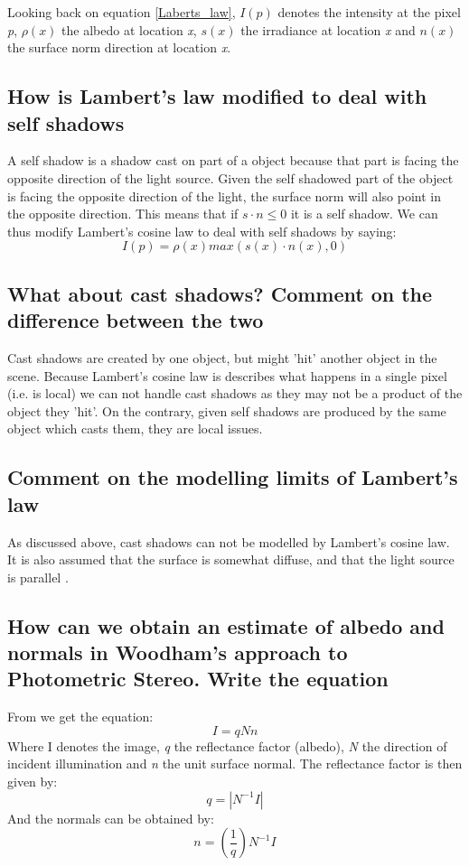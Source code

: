 Looking back on equation \ref{Laberts_law}, $I(p)$ denotes the intensity at the pixel \textit{p}, $\rho(x)$ the albedo at location \textit{x}, $s(x)$ the irradiance  at location \textit{x} and $n(x)$ the surface norm direction at location \textit{x}.

\subsection{How is Lambert’s law modified to deal with self shadows}
A self shadow is a shadow cast on part of a object because that part is facing the opposite direction of the light source. Given the self shadowed part of the object is facing the opposite direction of the light, the surface norm will also point in the opposite direction. This means that if $s \cdot n \leq 0$ it is a self shadow. We can thus modify Lambert's cosine law to deal with self shadows by saying:
\begin{equation*}
	I(p) = \rho(x)max(s(x) \cdot n(x), 0)
\end{equation*}

\subsection{What about cast shadows? Comment on the difference between the two}
Cast shadows are created by one object, but might 'hit' another object in the scene. Because Lambert's cosine law is describes what happens in a single pixel (i.e. is local) we can not handle cast shadows as they may not be a product of the object they 'hit'. On the contrary, given self shadows are produced by the same object which casts them, they are local issues.

\subsection{Comment on the modelling limits of Lambert’s law}
As discussed above, cast shadows can not be modelled by Lambert's cosine law. It is also assumed that the surface is somewhat diffuse, and that the light source is parallel .

\subsection{How can we obtain an estimate of albedo and normals in Woodham’s approach to Photometric Stereo. Write the equation}
From \cite{woodham} we get the equation:
\begin{equation*}
	I = qNn
\end{equation*}
Where I denotes the image, \textit{q} the reflectance factor (albedo), \textit{N} the direction of incident illumination and \textit{n} the unit surface normal. The reflectance factor is then given by:
\begin{equation*}
	q = |N^{-1}I|
\end{equation*}
And the normals can be obtained by:
\begin{equation*}
	n = \left(\frac{1}{q}\right)N^{-1}I
\end{equation*}

